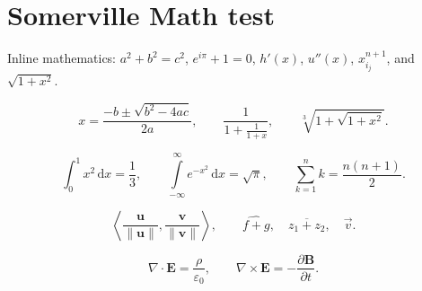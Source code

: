 \documentclass{article}
\begin{document}
\section*{Somerville Math test}

Inline mathematics: $a^2+b^2=c^2$, $e^{i\pi}+1=0$,
$h'(x)$, $u''(x)$, $x_{i_j}^{n+1}$, and $\sqrt{1+x^2}$.

\[
  x=\frac{-b\pm\sqrt{b^2-4ac}}{2a},
  \qquad
  \frac{1}{1+\frac{1}{1+x}},
  \qquad
  \sqrt[3]{1+\sqrt{1+x^2}}.
\]

\[
  \int_0^1 x^2\,\mathrm{d}x=\frac13,
  \qquad
  \int\limits_{-\infty}^{\infty}e^{-x^2}\,\mathrm{d}x=\sqrt{\pi},
  \qquad
  \sum_{k=1}^n k=\frac{n(n+1)}2.
\]

\[
  \left\langle\frac{\symbf{u}}{\lVert\symbf{u}\rVert},
  \frac{\symbf{v}}{\lVert\symbf{v}\rVert}\right\rangle,
  \qquad
  \widehat{f+g},\quad \overline{z_1+z_2},\quad \vec{v}.
\]

\[
  \nabla\cdot\symbf{E}=\frac{\rho}{\varepsilon_0},
  \qquad
  \nabla\times\symbf{E}=-\frac{\partial\symbf{B}}{\partial t}.
\]
\end{document}
